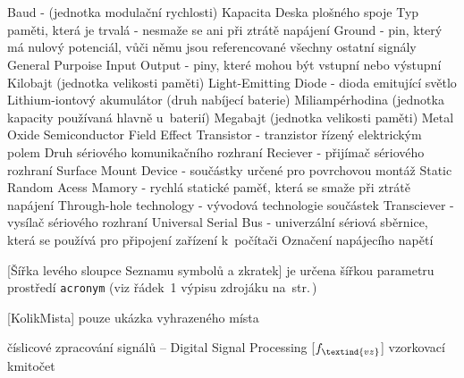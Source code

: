 \cleardoublepage
\chapter*{\listofabbrevname}
{}

\begin{acronym}[KolikMista]
		{Baud - (jednotka modulační rychlosti)}
		{Kapacita}
		{Deska plošného spoje}
		{Typ paměti, která je trvalá - nesmaže se ani při ztrátě napájení}
		{Ground - pin, který má nulový potenciál, vůči němu jsou referencované všechny ostatní signály}
		{General Purpoise Input Output - piny, které mohou být vstupní nebo výstupní}
		{Kilobajt (jednotka velikosti paměti)}
		{Light-Emitting Diode - dioda emitující světlo}
		{Lithium-iontový akumulátor (druh nabíjecí baterie)}
		{Miliampérhodina (jednotka kapacity používaná hlavně u~baterií)}
		{Megabajt (jednotka velikosti paměti)}
		{Metal Oxide Semiconductor Field Effect Transistor - tranzistor řízený elektrickým polem}	
		{Druh sériového komunikačního rozhraní} 
		{Reciever - přijímač sériového rozhraní}
		{Surface Mount Device - součástky určené pro povrchovou montáž} 
		{Static Random Acess Mamory - rychlá statické paměť, která se smaže při ztrátě napájení}	
		{Through-hole technology - vývodová technologie součástek}
		{Transciever - vysílač sériového rozhraní} 
		{Universal Serial Bus - univerzální sériová sběrnice, která se používá pro připojení zařízení k~počítači}
		{Označení napájecího napětí}


		[Šířka levého sloupce Seznamu symbolů a zkratek]								%
		{je určena šířkou parametru prostředí \texttt{acronym} (viz řádek~1 výpisu zdrojáku na~str.\,\pageref{lst:zkratky})}

		[KolikMista]
		{pouze ukázka vyhrazeného místa}

		{číslicové zpracování signálů -- Digital Signal Processing}
		[\ensuremath{f_\textind{vz}}] %
		{vzorkovací kmitočet}					%

\end{acronym}
